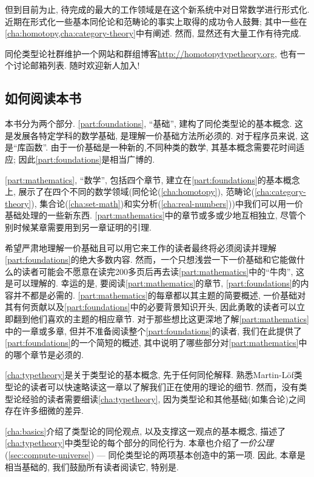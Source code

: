 %
但到目前为止, 待完成的最大的工作领域是在这个新系统中对日常数学进行形式化. 
近期在形式化一些基本同伦论和范畴论的事实上取得的成功令人鼓舞; 其中一些在\cref{cha:homotopy,cha:category-theory}中有阐述. 
然而, 显然还有大量工作有待完成. 

%

同伦类型论社群维护一个网站和群组博客\url{http://homotopytypetheory.org}, 也有一个讨论邮箱列表. 
随时欢迎新人加入!


\subsection*{如何阅读本书}

本书分为两个部分. 
\cref{part:foundations}, ``基础'', 建构了同伦类型论的基本概念. 
这是发展各特定学科的数学基础, 是理解一价基础方法所必须的. 对于程序员来说, 这是``库函数''. 
由于一价基础是一种新的,不同种类的数学, 其基本概念需要花时间适应; 因此\cref{part:foundations}是相当广博的. 

\cref{part:mathematics}, ``数学'', 包括四个章节, 建立在\cref{part:foundations}的基本概念上, 展示了在四个不同的数学领域(同伦论(\cref{cha:homotopy}), 范畴论(\cref{cha:category-theory}), 集合论(\cref{cha:set-math})和实分析(\cref{cha:real-numbers}))中我们可以用一价基础处理的一些新东西.
\cref{part:mathematics}中的章节或多或少地互相独立, 尽管个别时候某章需要用到另一章证明的引理. 

希望严肃地理解一价基础且可以用它来工作的读者最终将必须阅读并理解\cref{part:foundations}的绝大多数内容. 然而，一个只想浅尝一下一价基础和它能做什么的读者可能会不愿意在读完200多页后再去读\cref{part:mathematics}中的``牛肉'', 这是可以理解的. 
幸运的是, 要阅读\cref{part:mathematics}的章节, \cref{part:foundations}的内容并不都是必需的.  
\cref{part:mathematics}的每章都以其主题的简要概述, 一价基础对其有何贡献以及\cref{part:foundations}中的必要背景知识开头, 因此勇敢的读者可以立即翻到他们喜欢的主题的相应章节. 
对于那些想比这更深地了解\cref{part:mathematics}中的一章或多章, 但并不准备阅读整个\cref{part:foundations}的读者, 我们在此提供了\cref{part:foundations}的一个简短的概述, 其中说明了哪些部分对\cref{part:mathematics}中的哪个章节是必须的. 

\cref{cha:typetheory}是关于类型论的基本概念, 先于任何同伦解释. 
熟悉Martin-L\"of类型论的读者可以快速略读这一章以了解我们正在使用的理论的细节. 
然而，没有类型论经验的读者需要细读\cref{cha:typetheory}, 因为类型论和其他基础(如集合论)之间存在许多细微的差异. 

\cref{cha:basics}介绍了类型论的同伦观点, 以及支撑这一观点的基本概念, 描述了\cref{cha:typetheory}中类型论的每个部分的同伦行为. 
本章也介绍了\emph{一价公理} (\cref{sec:compute-universe}) --- 同伦类型论的两项基本创造中的第一项. 
因此, 本章是相当基础的, 我们鼓励所有读者阅读它, 特别是. 

